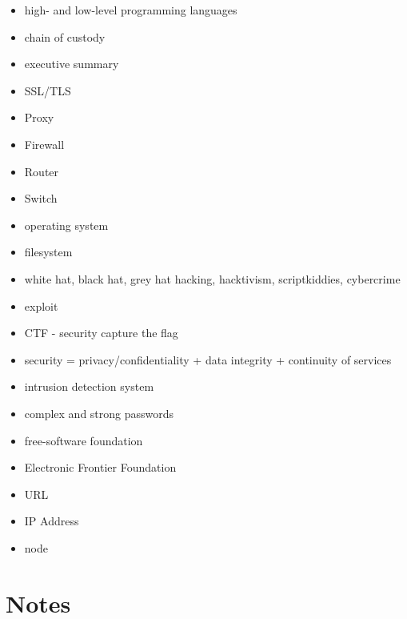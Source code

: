 \documentclass[letterpaper,10pt,english]{sphinxmanual}
\begin{document}
\begin{itemize}
\item {} 
high- and low-level programming languages

\item {} 
chain of custody

\item {} 
executive summary

\item {} 
SSL/TLS

\item {} 
Proxy

\item {} 
Firewall

\item {} 
Router

\item {} 
Switch

\item {} 
operating system

\item {} 
filesystem

\item {} 
white hat, black hat, grey hat hacking, hacktivism, scriptkiddies, cybercrime

\item {} 
exploit

\item {} 
CTF - security capture the flag

\item {} 
security = privacy/confidentiality + data integrity + continuity of services

\item {} 
intrusion detection system

\item {} 
complex and strong passwords

\item {} 
free-software foundation

\item {} 
Electronic Frontier Foundation

\item {} 
URL

\item {} 
IP Address

\item {} 
node

\end{itemize}


\section{Notes}
\label{cybersecurity:notes}
\end{document}
